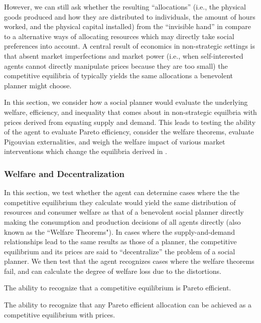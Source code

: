 However, we can still ask whether the resulting ``allocations'' (i.e., the physical goods produced and how they are distributed to individuals, the amount of hours worked, and the physical capital installed) from the ``invisible hand'' in \seventhParent compare to a alternative ways of allocating resources which may directly take social preferences into account.  A central result of economics in non-strategic settings is that absent market imperfections and market power (i.e., when self-interested agents cannot directly manipulate prices because they are too small) the competitive equilibria of \seventhParent typically yields the same allocations a benevolent planner might choose.

In this section, we consider how a social planner would evaluate the underlying welfare, efficiency, and inequality that comes about in non-strategic equilbria with prices derived from equating supply and demand.  This leads to testing the ability of the agent to evaluate Pareto efficiency, consider the welfare theorems, evaluate Pigouvian externalities, and weigh the welfare impact of various market interventions which change the equilibria derived in \seventhParent.  

\subsubsection{Welfare and Decentralization}\label{mod:welfare}
In this section, we test whether the agent can determine cases where the the competitive equilibrium they calculate would yield the same distribution of resources and consumer welfare as that of a benevolent social planner directly making the consumption and production decisions of all agents directly (also known as the ``Welfare Theorems").  In cases where the supply-and-demand relationships lead to the same results as those of a planner, the competitive equilibrium and its prices are said to ``decentralize'' the problem of a social planner.  We then test that the agent recognizes cases where the welfare theorems fail, and can calculate the degree of welfare loss due to the distortions.

\begin{el}\label{el:welfare_theorem_1}
    {The ability to recognize that a competitive equilibrium is Pareto efficient.}
\end{el}

\begin{el}\label{el:welfare_theorem_2}
    {The ability to recognize that any Pareto efficient allocation can be achieved as a competitive equilibrium with prices.}
\end{el}

